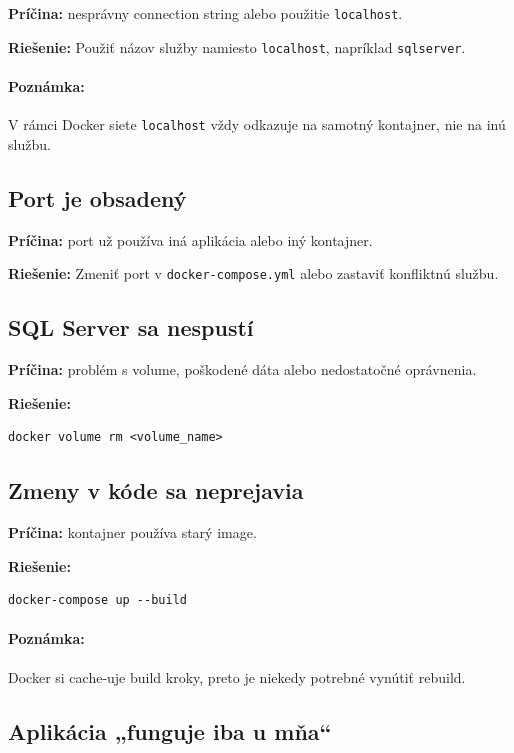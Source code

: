 \textbf{Príčina:} nesprávny connection string alebo použitie \texttt{localhost}.

\textbf{Riešenie:}
Použiť názov služby namiesto \texttt{localhost}, napríklad \texttt{sqlserver}.

\paragraph{Poznámka:}
V rámci Docker siete \texttt{localhost} vždy odkazuje na samotný kontajner, nie na inú službu.

\subsection{Port je obsadený}

\textbf{Príčina:} port už používa iná aplikácia alebo iný kontajner.

\textbf{Riešenie:}
Zmeniť port v \texttt{docker-compose.yml} alebo zastaviť konfliktnú službu.

\subsection{SQL Server sa nespustí}

\textbf{Príčina:} problém s volume, poškodené dáta alebo nedostatočné oprávnenia.

\textbf{Riešenie:}
\begin{verbatim}
docker volume rm <volume_name>
\end{verbatim}

\subsection{Zmeny v kóde sa neprejavia}

\textbf{Príčina:} kontajner používa starý image.

\textbf{Riešenie:}
\begin{verbatim}
docker-compose up --build
\end{verbatim}

\paragraph{Poznámka:}
Docker si cache-uje build kroky, preto je niekedy potrebné vynútiť rebuild.

\subsection{Aplikácia „funguje iba u mňa“}

